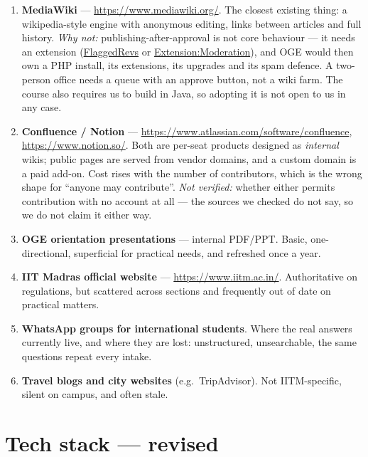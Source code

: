 \documentclass[11pt]{article}
\begin{document}
\begin{enumerate}
  \item \textbf{MediaWiki} --- \url{https://www.mediawiki.org/}. The closest existing thing: a
        wikipedia-style engine with anonymous editing, links between articles and full history.
        \emph{Why not:} publishing-after-approval is not core behaviour --- it needs an extension
        (\href{https://www.mediawiki.org/wiki/Extension:FlaggedRevs}{FlaggedRevs} or
        \href{https://www.mediawiki.org/wiki/Extension:Moderation}{Extension:Moderation}), and OGE
        would then own a PHP install, its extensions, its upgrades and its spam defence. A
        two-person office needs a queue with an approve button, not a wiki farm. The course also
        requires us to build in Java, so adopting it is not open to us in any case.
  \item \textbf{Confluence / Notion} --- \url{https://www.atlassian.com/software/confluence},
        \url{https://www.notion.so/}. Both are per-seat products designed as \emph{internal} wikis;
        public pages are served from vendor domains, and a custom domain is a paid add-on. Cost
        rises with the number of contributors, which is the wrong shape for ``anyone may
        contribute''. \emph{Not verified:} whether either permits contribution with no account at
        all --- the sources we checked do not say, so we do not claim it either way.
  \item \textbf{OGE orientation presentations} --- internal PDF/PPT. Basic, one-directional,
        superficial for practical needs, and refreshed once a year.
  \item \textbf{IIT Madras official website} --- \url{https://www.iitm.ac.in/}. Authoritative on
        regulations, but scattered across sections and frequently out of date on practical matters.
  \item \textbf{WhatsApp groups for international students}. Where the real answers currently live,
        and where they are lost: unstructured, unsearchable, the same questions repeat every intake.
  \item \textbf{Travel blogs and city websites} (e.g.\ TripAdvisor). Not IITM-specific, silent on
        campus, and often stale.
\end{enumerate}

\section{Tech stack --- revised}
\end{document}
